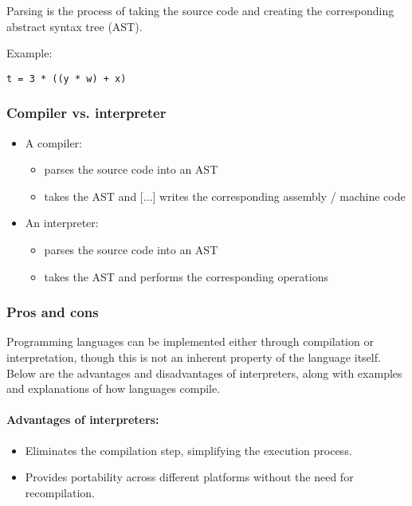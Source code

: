 \documentclass[12pt]{article}
\begin{document}
Parsing is the process of taking the source code and creating the corresponding abstract syntax tree (AST).

Example:

\begin{lstlisting}
t = 3 * ((y * w) + x)
\end{lstlisting}


\subsubsection{Compiler vs. interpreter}

\begin{itemize}
  \item A compiler:
  \begin{itemize}
    \item parses the source code into an AST
    \item takes the AST and [...] writes the corresponding assembly / machine code
  \end{itemize}
  \item An interpreter:
  \begin{itemize}
    \item parses the source code into an AST
    \item takes the AST and performs the corresponding operations
  \end{itemize}
\end{itemize}

\subsubsection{Pros and cons}
Programming languages can be implemented either through compilation or interpretation, though this is not an inherent property of the language itself. Below are the advantages and disadvantages of interpreters, along with examples and explanations of how languages compile.

\paragraph{Advantages of interpreters:}
\begin{itemize}
    \item Eliminates the compilation step, simplifying the execution process.
    \item Provides portability across different platforms without the need for recompilation.
\end{itemize}
\end{document}
